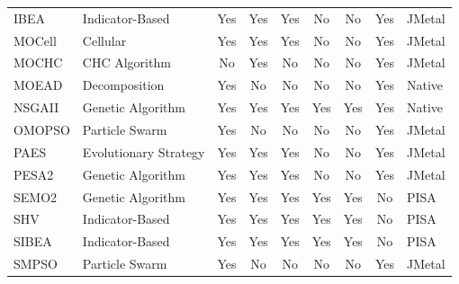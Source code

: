 \begin{sidewaystable}
\begin{tabular}{ll|cccccc|l}
  IBEA & Indicator-Based & \cellcolor{green!25}Yes & \cellcolor{green!25}Yes & \cellcolor{green!25}Yes & \cellcolor{red!25}No & \cellcolor{red!25}No & \cellcolor{green!25}Yes & JMetal \\
  MOCell & Cellular & \cellcolor{green!25}Yes & \cellcolor{green!25}Yes & \cellcolor{green!25}Yes & \cellcolor{red!25}No & \cellcolor{red!25}No & \cellcolor{green!25}Yes & JMetal \\
  MOCHC & CHC Algorithm & \cellcolor{red!25}No & \cellcolor{green!25}Yes & \cellcolor{red!25}No & \cellcolor{red!25}No & \cellcolor{red!25}No & \cellcolor{green!25}Yes & JMetal \\
  MOEAD & Decomposition & \cellcolor{green!25}Yes & \cellcolor{red!25}No & \cellcolor{red!25}No & \cellcolor{red!25}No & \cellcolor{red!25}No & \cellcolor{green!25}Yes & Native \\
  NSGAII & Genetic Algorithm & \cellcolor{green!25}Yes & \cellcolor{green!25}Yes & \cellcolor{green!25}Yes & \cellcolor{green!25}Yes & \cellcolor{green!25}Yes & \cellcolor{green!25}Yes & Native \\
  OMOPSO & Particle Swarm & \cellcolor{green!25}Yes & \cellcolor{red!25}No & \cellcolor{red!25}No & \cellcolor{red!25}No & \cellcolor{red!25}No & \cellcolor{green!25}Yes & JMetal \\
  PAES & Evolutionary Strategy & \cellcolor{green!25}Yes & \cellcolor{green!25}Yes & \cellcolor{green!25}Yes & \cellcolor{red!25}No & \cellcolor{red!25}No & \cellcolor{green!25}Yes & JMetal \\
  PESA2 & Genetic Algorithm & \cellcolor{green!25}Yes & \cellcolor{green!25}Yes & \cellcolor{green!25}Yes & \cellcolor{red!25}No & \cellcolor{red!25}No & \cellcolor{green!25}Yes & JMetal \\
  SEMO2 & Genetic Algorithm & \cellcolor{green!25}Yes & \cellcolor{green!25}Yes & \cellcolor{green!25}Yes & \cellcolor{green!25}Yes & \cellcolor{green!25}Yes & \cellcolor{red!25}No & PISA \\
  SHV & Indicator-Based & \cellcolor{green!25}Yes & \cellcolor{green!25}Yes & \cellcolor{green!25}Yes & \cellcolor{green!25}Yes & \cellcolor{green!25}Yes & \cellcolor{red!25}No & PISA \\
  SIBEA & Indicator-Based & \cellcolor{green!25}Yes & \cellcolor{green!25}Yes & \cellcolor{green!25}Yes & \cellcolor{green!25}Yes & \cellcolor{green!25}Yes & \cellcolor{red!25}No & PISA \\
  SMPSO & Particle Swarm & \cellcolor{green!25}Yes & \cellcolor{red!25}No & \cellcolor{red!25}No & \cellcolor{red!25}No & \cellcolor{red!25}No & \cellcolor{green!25}Yes & JMetal \\

\end{tabular}
\end{sidewaystable}
